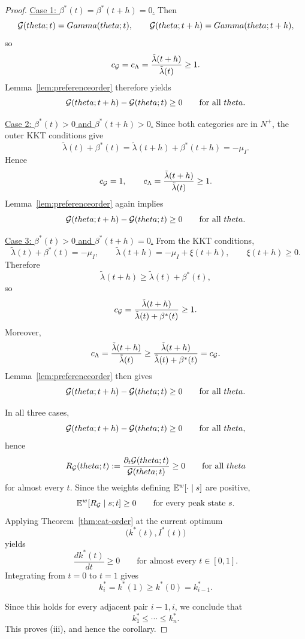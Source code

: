 \documentclass[master.tex]{subfiles}
\begin{document}
\begin{proof}
\smallskip
\noindent\underline{Case 1: \(\beta^\ast(t)=\beta^\ast(t+h)=0\).}
Then
\[
\mathcal{G}(theta;t)=Gamma(theta;t),
\qquad
\mathcal{G}(theta;t+h)=Gamma(theta;t+h),
\]
so
\[
c_{\mathcal{G}}=c_\Lambda=\frac{\tilde\lambda(t+h)}{\tilde\lambda(t)}\ge 1.
\]
Lemma~\ref{lem:preferenceorder} therefore yields
\[
\mathcal{G}(theta;t+h)-\mathcal{G}(theta;t)\ge 0
\qquad
\text{for all }theta.
\]

\smallskip
\noindent\underline{Case 2: \(\beta^\ast(t)>0\) and \(\beta^\ast(t+h)>0\).}
Since both categories are in \(N^+\), the outer KKT conditions give
\[
\tilde\lambda(t)+\beta^\ast(t)
=
\tilde\lambda(t+h)+\beta^\ast(t+h)
=
-\mu_I.
\]
Hence
\[
c_{\mathcal{G}}=1,
\qquad
c_\Lambda=\frac{\tilde\lambda(t+h)}{\tilde\lambda(t)}\ge 1.
\]
Lemma~\ref{lem:preferenceorder} again implies
\[
\mathcal{G}(theta;t+h)-\mathcal{G}(theta;t)\ge 0
\qquad
\text{for all }theta.
\]

\smallskip
\noindent\underline{Case 3: \(\beta^\ast(t)>0\) and \(\beta^\ast(t+h)=0\).}
From the KKT conditions,
\[
\tilde\lambda(t)+\beta^\ast(t)=-\mu_I,
\qquad
\tilde\lambda(t+h)=-\mu_I+\xi(t+h),
\qquad
\xi(t+h)\ge 0.
\]
Therefore
\[
\tilde\lambda(t+h)\ge \tilde\lambda(t)+\beta^\ast(t),
\]
so
\[
c_{\mathcal{G}}
=
\frac{\tilde\lambda(t+h)}{\tilde\lambda(t)+\beta^\ast(t)}
\ge 1.
\]
Moreover,
\[
c_\Lambda
=
\frac{\tilde\lambda(t+h)}{\tilde\lambda(t)}
\ge
\frac{\tilde\lambda(t+h)}{\tilde\lambda(t)+\beta^\ast(t)}
=
c_{\mathcal{G}}.
\]
Lemma~\ref{lem:preferenceorder} then gives
\[
\mathcal{G}(theta;t+h)-\mathcal{G}(theta;t)\ge 0
\qquad
\text{for all }theta.
\]

\smallskip
In all three cases,
\[
\mathcal{G}(theta;t+h)-\mathcal{G}(theta;t)\ge 0
\qquad
\text{for all }theta,
\]
hence
\[
R_{\mathcal{G}}(theta;t):=
\frac{\partial_t\mathcal{G}(theta;t)}{\mathcal{G}(theta;t)}
\ge 0
\qquad
\text{for all }theta
\]
for almost every \(t\). Since the weights defining \(\mathbb{E}^w[\cdot\mid s]\) are positive,
\[
\mathbb{E}^w\!\left[R_{\mathcal{G}}\mid s;t\right]\ge 0
\qquad
\text{for every peak state } s.
\]
Applying Theorem~\ref{thm:cat-order} at the current optimum
\[
\bigl(k^\ast(t),I^\ast(t)\bigr)
\]
yields
\[
\frac{d k^\ast(t)}{dt}\ge 0
\qquad
\text{for almost every } t\in[0,1].
\]
Integrating from \(t=0\) to \(t=1\) gives
\[
k_i^\ast=k^\ast(1)\ge k^\ast(0)=k_{i-1}^\ast.
\]

Since this holds for every adjacent pair \(i-1,i\), we conclude that
\[
k_1^\ast\le \cdots \le k_n^\ast.
\]
This proves (iii), and hence the corollary.
\end{proof}

\end{document}
